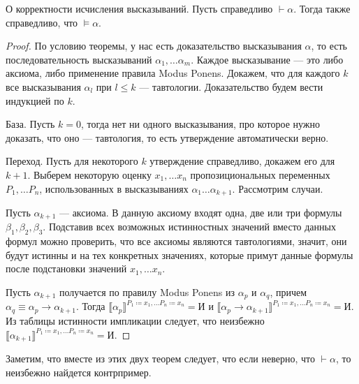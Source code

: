 \begin{theorem}{О корректности исчисления высказываний.}
Пусть справедливо $\vdash \alpha$. Тогда также справедливо, что $\models \alpha$.
\end{theorem}

\begin{proof}
По условию теоремы, у нас есть доказательство высказывания $\alpha$, то есть 
последовательность высказываний $\alpha_1, \dots \alpha_m$.
Каждое высказывание --- это либо аксиома, либо применение правила Modus Ponens.
Докажем, что для каждого $k$ все высказывания $\alpha_l$ при $l \le k$ --- тавтологии.
Доказательство будем вести индукцией по $k$.

База. Пусть $k=0$, тогда нет ни одного высказывания, про которое нужно доказать, что
оно --- тавтология, то есть утверждение автоматически верно.

Переход. Пусть для некоторого $k$ утверждение справедливо, докажем его для $k+1$.
Выберем некоторую оценку $x_1, \dots x_n$ пропозициональных 
переменных $P_1, \dots P_n$, использованных в высказываниях $\alpha_1 \dots \alpha_{k+1}$.
Рассмотрим случаи. 

Пусть $\alpha_{k+1}$ --- аксиома. В данную аксиому входят одна, две или три формулы
$\beta_1, \beta_2, \beta_3$. Подставив всех возможных истинностных значений
вместо данных формул можно проверить, что все аксиомы являются тавтологиями,
значит, они будут истинны и на тех конкретных значениях, которые примут данные формулы
после подстановки значений $x_1, \dots x_n$.

Пусть $\alpha_{k+1}$ получается по правилу Modus Ponens из $\alpha_p$ и 
$\alpha_q$, причем $\alpha_q \equiv \alpha_p \rightarrow \alpha_{k+1}$.
Тогда $\llbracket\alpha_p\rrbracket^{P_1 \coloneqq  x_1, \dots P_n\coloneqq x_n} = \texttt{И}$ и 
$\llbracket\alpha_p \rightarrow \alpha_{k+1}\rrbracket^{P_1\coloneqq x_1, \dots P_n\coloneqq x_n} = \texttt{И}$.
Из таблицы истинности импликации следует, что неизбежно 
$\llbracket\alpha_{k+1}\rrbracket^{P_1\coloneqq x_1, \dots P_n\coloneqq x_n} = \texttt{И}$.

\end{proof}

Заметим, что вместе из этих двух теорем следует, что если неверно, что $\vdash \alpha$,
то неизбежно найдется контрпример.

